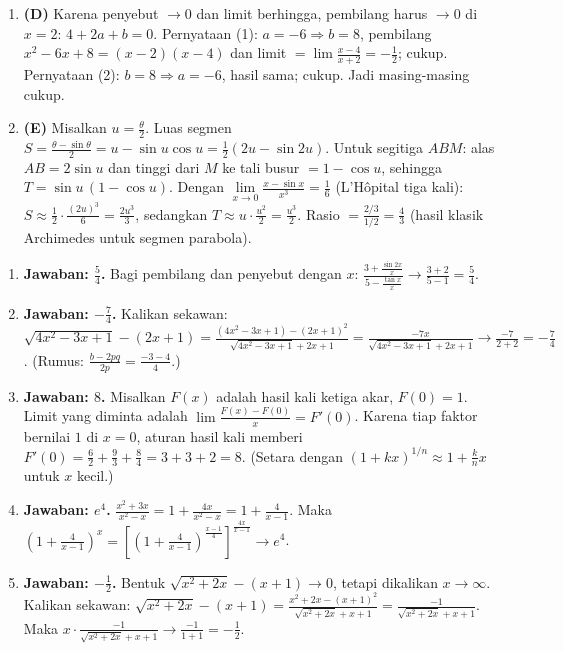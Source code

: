 \documentclass[a4paper,11pt]{article}
\newcounter{no}
\begin{document}
\begin{enumerate}[leftmargin=2em,itemsep=2pt,topsep=2pt]
\item[\textbf{19.}] \textbf{(D)} Karena penyebut $\to0$ dan limit berhingga, pembilang harus $\to0$ di $x=2$: $4+2a+b=0$. Pernyataan (1): $a=-6\Rightarrow b=8$, pembilang $x^2-6x+8=(x-2)(x-4)$ dan limit $=\lim\frac{x-4}{x+2}=-\frac12$; cukup. Pernyataan (2): $b=8\Rightarrow a=-6$, hasil sama; cukup. Jadi masing-masing cukup.
\item[\textbf{20.}] \textbf{(E)} Misalkan $u=\frac\theta2$. Luas segmen $S=\frac{\theta-\sin\theta}{2}=u-\sin u\cos u=\frac12(2u-\sin2u)$. Untuk segitiga $ABM$: alas $AB=2\sin u$ dan tinggi dari $M$ ke tali busur $=1-\cos u$, sehingga $T=\sin u\,(1-\cos u)$. Dengan $\lim\limits_{x\to0}\frac{x-\sin x}{x^3}=\frac16$ (L'H\^opital tiga kali): $S\approx\frac12\cdot\frac{(2u)^3}{6}=\frac{2u^3}{3}$, sedangkan $T\approx u\cdot\frac{u^2}{2}=\frac{u^3}{2}$. Rasio $=\frac{2/3}{1/2}=\frac43$ (hasil klasik Archimedes untuk segmen parabola).
\end{enumerate}
\par{}\par\vspace{0.2em}
\small\begin{enumerate}[leftmargin=2em,itemsep=2pt,topsep=2pt]
\item[\textbf{1.}] \textbf{Jawaban: $\frac54$.} Bagi pembilang dan penyebut dengan $x$: $\frac{3+\frac{\sin2x}{x}}{5-\frac{\tan x}{x}}\to\frac{3+2}{5-1}=\frac54$.
\item[\textbf{2.}] \textbf{Jawaban: $-\frac74$.} Kalikan sekawan: $\sqrt{4x^2-3x+1}-(2x+1)=\frac{(4x^2-3x+1)-(2x+1)^2}{\sqrt{4x^2-3x+1}+2x+1}=\frac{-7x}{\sqrt{4x^2-3x+1}+2x+1}\to\frac{-7}{2+2}=-\frac74$. (Rumus: $\frac{b-2pq}{2p}=\frac{-3-4}{4}$.)
\item[\textbf{3.}] \textbf{Jawaban: $8$.} Misalkan $F(x)$ adalah hasil kali ketiga akar, $F(0)=1$. Limit yang diminta adalah $\lim\frac{F(x)-F(0)}{x}=F'(0)$. Karena tiap faktor bernilai $1$ di $x=0$, aturan hasil kali memberi $F'(0)=\frac62+\frac93+\frac84=3+3+2=8$. (Setara dengan $(1+kx)^{1/n}\approx1+\frac knx$ untuk $x$ kecil.)
\item[\textbf{4.}] \textbf{Jawaban: $e^4$.} $\frac{x^2+3x}{x^2-x}=1+\frac{4x}{x^2-x}=1+\frac4{x-1}$. Maka $\left(1+\frac4{x-1}\right)^x=\left[\left(1+\frac4{x-1}\right)^{\frac{x-1}4}\right]^{\frac{4x}{x-1}}\to e^4$.
\item[\textbf{5.}] \textbf{Jawaban: $-\frac12$.} Bentuk $\sqrt{x^2+2x}-(x+1)\to0$, tetapi dikalikan $x\to\infty$. Kalikan sekawan: $\sqrt{x^2+2x}-(x+1)=\frac{x^2+2x-(x+1)^2}{\sqrt{x^2+2x}+x+1}=\frac{-1}{\sqrt{x^2+2x}+x+1}$. Maka $x\cdot\frac{-1}{\sqrt{x^2+2x}+x+1}\to\frac{-1}{1+1}=-\frac12$.
\end{enumerate}
\end{document}
